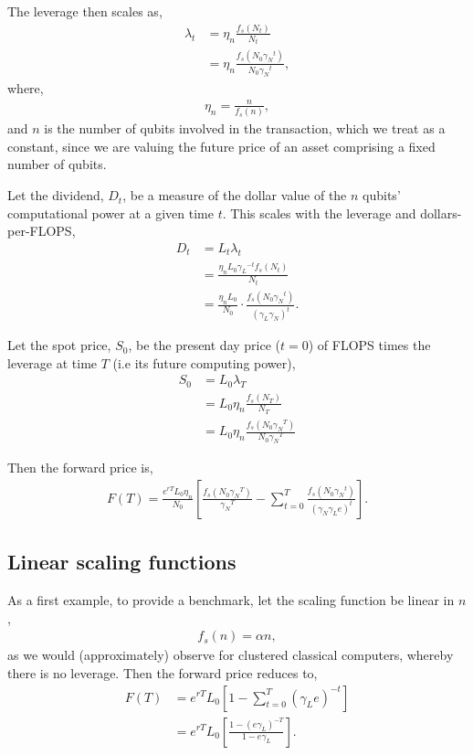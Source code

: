 \documentclass[aps,pra,twocolumn,amsmath,amssymb,nofootinbib,superscriptaddress]{revtex4}
\begin{document}
The leverage then scales as,
\begin{align}
\lambda_t &= \eta_n \frac{f_s(N_t)}{N_t} \nonumber \\
&= \eta_n \frac{f_s(N_0 {\gamma_N}^{t})}{N_0 {\gamma_N}^{t}},
\end{align}
where,
\begin{align}
	\eta_n = \frac{n}{f_s(n)},
\end{align}
and $n$ is the number of qubits involved in the transaction, which we treat as a constant, since we are valuing the future price of an asset comprising a fixed number of qubits.

Let the dividend, $D_t$, be a measure of the dollar value of the $n$ qubits' computational power at a given time $t$. This scales with the leverage and dollars-per-FLOPS,
\begin{align}
D_t &= L_t \lambda_t \nonumber \\
&= \frac{\eta_n L_0 {\gamma_L}^{-t} f_s(N_t)}{N_t} \nonumber \\
&= \frac{\eta_n L_0}{N_0} \cdot \frac{f_s(N_0 {\gamma_N}^{t})}{(\gamma_L\gamma_N)^{t}}.
\end{align}

Let the spot price, $S_0$, be the present day price ($t=0$) of FLOPS times the leverage at time $T$ (i.e its future computing power),
\begin{align}
S_0 &= L_0 \lambda_T \nonumber \\
&= L_0 \eta_n \frac{f_s(N_T)}{N_T} \nonumber \\
&= L_0 \eta_n \frac{f_s(N_0 {\gamma_N}^{T})}{N_0 {\gamma_N}^{T}}
\end{align}

Then the forward price is,
\begin{align}
F(T) = \frac{e^{rT}L_0\eta_n}{N_0} \left[ \frac{f_s(N_0 {\gamma_N}^{T})}{{\gamma_N}^{T}} - \sum_{t=0}^{T} \frac{f_s(N_0 {\gamma_N}^{t})}{(\gamma_N \gamma_L e)^{t}} \right].
\end{align}

\subsection{Linear scaling functions}

As a first example, to provide a benchmark, let the scaling function be linear in $n$,
\begin{align}
f_s(n) = \alpha n,	
\end{align}
as we would (approximately) observe for clustered classical computers, whereby there is no leverage. Then the forward price reduces to,
\begin{align}
F(T) &= {e^{rT}L_0} \left[1 - \sum_{t=0}^{T} (\gamma_L e)^{-t} \right] \nonumber \\
&= {e^{rT}L_0} \left[\frac{1-(e\gamma_L)^{-T}}{1-e\gamma_L} \right].
\end{align}
\end{document}
